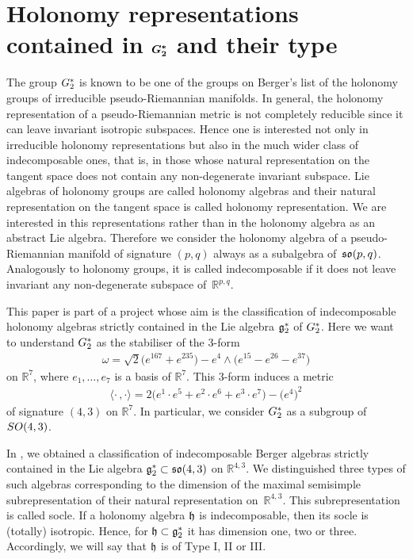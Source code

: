 \documentclass[11pt]{article}
\numberwithin{equation}{section}
\newcommand\fg{{\frak{g}}}
\newcommand\fh{{\frak h}}
\newcommand{\fso}{\mathop{{\frak s \frak o}}}
\newcommand\RR{{\mathbb R}}
\newcommand{\SO}{\mathop{{\rm SO}}}
\newcommand{\G}{\mathop{{{\rm G}_{2}^*}}}
\newcommand\ip{{\langle\cdot \,,\cdot \rangle}}
\begin{document}
\section[Holonomy representations contained in $\G$ and their type]{Holonomy representations contained in $\boldsymbol{\G}$ and their type}

The group $\G$ is known to be one of the groups on Berger's list of the holonomy groups of irreducible pseudo-Riemannian manifolds. In general, the holonomy representation of a pseudo-Riemannian metric is not completely reducible since it can leave invariant isotropic subspaces. Hence one is interested not only in irreducible holonomy representations but also in the much wider class of indecomposable ones, that is, in those whose natural representation on the tangent space does not contain any non-degenerate invariant subspace. Lie algebras of holonomy groups are called holonomy algebras and their natural representation on the tangent space is called holonomy representation. We are interested in this representations rather than in the holonomy algebra as an abstract Lie algebra. Therefore we consider the holonomy algebra of a pseudo-Riemannian manifold of signature $(p,q)$ always as a subalgebra of~$\fso(p,q)$. Analogously to holonomy groups, it is called indecomposable if it does not leave invariant any non-degenerate subspace of~$\RR^{p,q}$.

This paper is part of a project whose aim is the classification of indecomposable holonomy algebras strictly contained in the Lie algebra $\fg^*_2$ of $\G$. Here we want to understand $\G$ as the stabiliser of the 3-form
\begin{gather}\label{Eomega1}
\omega=\sqrt 2\big(e^{167}+e^{235}\big)-e^4\wedge \big(e^{15}-e^{26}-e^{37}\big)
\end{gather}
on $\RR^7$, where $e_1,\dots,e_7$ is a basis of $\RR^7$. This 3-form induces a metric
\begin{gather}
\ip = 2\big(e^1\cdot e^5+e^2\cdot e^6+e^3\cdot e^7\big)- \big(e^4\big)^2 \label{Eip1}
\end{gather}
of signature $(4,3)$ on $\RR^7$. In particular, we consider $\G$ as a subgroup of $\SO(4,3)$.

In \cite{FK}, we obtained a classification of indecomposable Berger algebras strictly contained in the Lie algebra $\fg^*_2\subset \fso(4,3)$ on $\RR^{4,3}$. We distinguished three types of such algebras corresponding to the dimension of the maximal semisimple subrepresentation of their natural representation on~${\mathbb R}^{4,3}$. This subrepresentation is called socle. If a holonomy algebra $\fh$ is indecomposable, then its socle is (totally) isotropic. Hence, for $\fh\subset\fg_2^*$ it has dimension one, two or three. Accordingly, we will say that $\frak h$ is of Type I, II or III.
\end{document}
